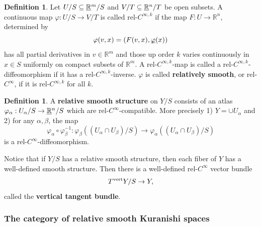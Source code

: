 \documentclass[reqno, 10pt]{amsart}
\numberwithin{equation}{section}
\numberwithin{equation}{section}
\renewcommand{\subset}{\subseteq}
\theoremstyle{definition}
\newtheorem{defn}[thm]{Definition}
\theoremstyle{remark}
\newcommand{\beqn}{\begin{equation*}}
\newcommand{\eeqn}{\end{equation*}}
\newcommand{\mb}{\mathbb}
\newcommand{\uds}[1]{\underline{\smash{#1}}}
\begin{document}
\begin{defn}
Let $U/S \subset \uds{\mb R}^m/S$ and $V/T \subset \uds{\mb R}^n/T$ be open subsets. A continuous map $\varphi: U/S \to V/T$ is called rel-$C^{\infty, k}$ if the map $F: U \to {\mb R}^n$, determined by 
\beqn
\varphi(v, x) = (F(v, x), \uds\varphi(x))
\eeqn
has all partial derivatives in $v \in {\mb R}^m$ and those up order $k$ varies continuously in $x \in S$ uniformly on compact subsets of ${\mb R}^m$. A rel-$C^{\infty, k}$-map is called a rel-$C^{\infty, k}$-diffeomorphism if it has a rel-$C^{\infty, k}$-inverse. $\varphi$ is called {\bf relatively smooth}, or rel-$C^\infty$, if it is rel-$C^{\infty, k}$ for all $k$.
\end{defn}

\begin{defn}
A {\bf relative smooth structure} on $Y/S$ consists of an atlas $\varphi_\alpha: U_\alpha/S \to \uds{\mb R}^n/S$ which are rel-$C^{\infty}$-compatible. More precisely 1) $Y = \cup U_\alpha$ and 2) for any $\alpha, \beta$, the map 
\beqn
\varphi_\alpha \circ \varphi_\beta^{-1}: \varphi_\beta( (U_\alpha \cap U_\beta)/S) \to \varphi_\alpha( (U_\alpha \cap U_\beta)/S)
\eeqn
is a rel-$C^{\infty}$-diffeomorphism.
\end{defn}


Notice that if $Y/S$ has a relative smooth structure, then each fiber of $Y$ has a well-defined smooth structure. Then there is a well-defined rel-$C^\infty$ vector bundle
\beqn
T^{\rm vert} Y/S \to Y,
\eeqn
called the {\bf vertical tangent bundle}.


\subsubsection{The category of relative smooth Kuranishi spaces}
\end{document}

